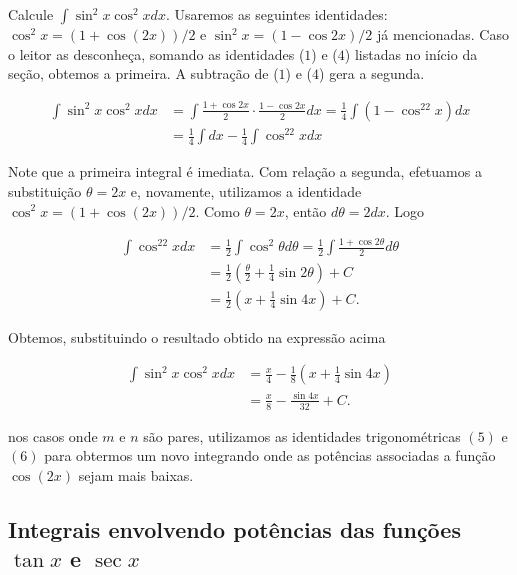 	\begin{ex}
		Calcule $\int \sin^2x \cos^2 x dx$. Usaremos as seguintes identidades: $\cos^2x =( 1 + \cos(2x))/2$ e $\sin^2x = (1 - \cos2x)/2$ já mencionadas. Caso o leitor as desconheça, somando as identidades ($1$) e ($4$) listadas no início da seção, obtemos a primeira. A subtração de ($1$) e ($4$) gera a segunda.    
	
	\[\begin{split}
		\int \sin^2x \cos^2 x dx & = \int \frac{1 + \cos2x}{2} \cdot \frac{1 - \cos2x}{2}dx = \frac{1}{4}\int (1 - \cos^22x)dx \\
		& = \frac{1}{4}\int dx - \frac{1}{4}\int\cos^22x	dx	
	\end{split}\]
	
	 Note que a primeira integral é imediata. Com relação a segunda, efetuamos a substituição $\theta = 2x$ e, novamente, utilizamos a identidade $\cos^2x =( 1 + \cos(2x))/2$. Como $\theta = 2x$, então $d\theta = 2dx$. Logo 
	
	\[\begin{split}
		\int \cos^22x dx & = \frac{1}{2}\int \cos^2 \theta d\theta = \frac{1}{2}\int \frac{1 + \cos2\theta}{2}d\theta \\
		& = \frac{1}{2} (\frac{\theta}{2} + \frac{1}{4}\sin 2\theta ) + C\\
		& = \frac{1}{2}(x + \frac{1}{4}\sin 4x) + C.
	\end{split}\]
	
	Obtemos, substituindo o resultado obtido na expressão acima 
	
	\[\begin{split}
		\int \sin^2x \cos^2 x dx & = \frac{x}{4 } - \frac{1}{8}(x + \frac{1}{4}\sin 4x) \\
		& = \frac{x}{8} - \frac{\sin 4x}{32} + C.		
	\end{split}\]
	\end{ex}
	
	\begin{obs}
		nos casos onde $m$ e $n$ são pares, utilizamos as identidades trigonométricas $(5)$ e $(6)$ para obtermos um novo integrando onde as potências associadas a função $\cos(2x)$ sejam mais baixas. 
	\end{obs} 
	
\subsection*{Integrais envolvendo potências das funções $\tan x$ e $\sec x$}
	
